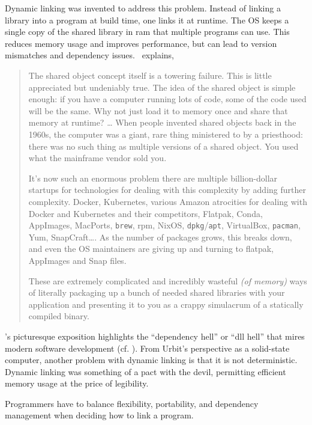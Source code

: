 \documentclass[twoside]{article}
\begin{document}
Dynamic linking was invented to address this problem.  Instead of linking a library into a program at build time, one links it at runtime.  The OS keeps a single copy of the shared library in {\sc ram} that multiple programs can use.  This reduces memory usage and improves performance, but can lead to version mismatches and dependency issues.  \citeauthor{Locklin2022}~explains,

\begin{quote}
The shared object concept itself is a towering failure. This is little appreciated but undeniably true. The idea of the shared object is simple enough: if you have a computer running lots of code, some of the code used will be the same. Why not just load it to memory once and share that memory at runtime? … When people invented shared objects back in the 1960s, the computer was a giant, rare thing ministered to by a priesthood: there was no such thing as multiple versions of a shared object. You used what the mainframe vendor sold you.

\sloppy
It's now such an enormous problem there are multiple billion-dollar startups for technologies for dealing with this complexity by adding further complexity. Docker, Kubernetes, various Amazon atrocities for dealing with Docker and Kubernetes and their competitors, Flatpak, Conda, AppImages, MacPorts, \texttt{brew}, {\sc rpm}, NixOS, \texttt{dpkg}/\texttt{apt}, VirtualBox, \texttt{pacman}, Yum, SnapCraft…. As the number of packages grows, this breaks down, and even the OS maintainers are giving up and turning to flatpak, AppImages and Snap files.

\sloppy
These are extremely complicated and incredibly wasteful \emph{(of memory)} ways of literally packaging up a bunch of needed shared libraries with your application and presenting it to you as a crappy simulacrum of a statically compiled binary.  \citep{Locklin2022}
\end{quote}

\noindent
\citeauthor{Locklin2022}'s picturesque exposition highlights the “dependency hell” or “{\sc dll} hell” that mires modern software development (cf. \citet{Grimes2003}).  From Urbit's perspective as a solid-state computer, another problem with dynamic linking is that it is not deterministic.  Dynamic linking was something of a pact with the devil, permitting efficient memory usage at the price of legibility.

Programmers have to balance flexibility, portability, and dependency management when deciding how to link a program.
\end{document}
